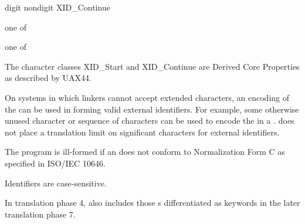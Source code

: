 \documentclass{wg21}
\begin{document}
\begin{bnf}
    \br
    digit\br
    nondigit\br
    \textnormal{ XID_Continue}
\end{bnf}

\begin{bnf}
     \textnormal{one of}\br
    \br
    \br
    \br
\end{bnf}

\begin{bnf}
     \textnormal{one of}\br
\end{bnf}

\pnum
{}%
%
The character classes XID_Start and XID_Continue
are Derived Core Properties as described by UAX44.
\begin{removedblock}
\begin{wfootnote}
    On systems in which linkers cannot accept extended
    characters, an encoding of the  can be used in
    forming valid external identifiers. For example, some otherwise unused
    character or sequence of characters can be used to encode the
     in a .  \Cpp{} does not
    place a translation limit on significant characters for external
    identifiers.
\end{wfootnote}
\end{removedblock}


The program is ill-formed
if an  does not conform to
Normalization Form C as specified in ISO/IEC 10646.
\begin{note}
    Identifiers are case-sensitive.
\end{note}
\begin{note}
    In translation phase 4,
     also includes
    those s
    differentiated as keywords
    in the later translation phase 7.
\end{note}
\end{document}
